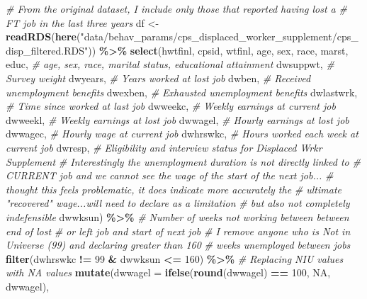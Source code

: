 \documentclass[
]{article}
\newenvironment{Shaded}{\begin{snugshade}}{\end{snugshade}}
\newcommand{\AttributeTok}[1]{\textcolor[rgb]{0.13,0.29,0.53}{#1}}
\newcommand{\CommentTok}[1]{\textcolor[rgb]{0.56,0.35,0.01}{\textit{#1}}}
\newcommand{\ConstantTok}[1]{\textcolor[rgb]{0.56,0.35,0.01}{#1}}
\newcommand{\DecValTok}[1]{\textcolor[rgb]{0.00,0.00,0.81}{#1}}
\newcommand{\FunctionTok}[1]{\textcolor[rgb]{0.13,0.29,0.53}{\textbf{#1}}}
\newcommand{\NormalTok}[1]{#1}
\newcommand{\OtherTok}[1]{\textcolor[rgb]{0.56,0.35,0.01}{#1}}
\newcommand{\SpecialCharTok}[1]{\textcolor[rgb]{0.81,0.36,0.00}{\textbf{#1}}}
\newcommand{\StringTok}[1]{\textcolor[rgb]{0.31,0.60,0.02}{#1}}
\begin{document}
\begin{Shaded}
\begin{Highlighting}[]
\CommentTok{\# From the original dataset, I include only those that reported having lost a }
\CommentTok{\# FT job in the last three years}
\NormalTok{df }\OtherTok{\textless{}{-}} \FunctionTok{readRDS}\NormalTok{(}\FunctionTok{here}\NormalTok{(}\StringTok{"data/behav\_params/cps\_displaced\_worker\_supplement/cps\_disp\_filtered.RDS"}\NormalTok{)) }\SpecialCharTok{\%\textgreater{}\%} 
  \FunctionTok{select}\NormalTok{(hwtfinl, cpsid, wtfinl, age, sex, race, marst, educ, }
         \CommentTok{\# age, sex, race, marital status, educational attainment}
\NormalTok{         dwsuppwt, }\CommentTok{\# Survey weight}
\NormalTok{         dwyears, }\CommentTok{\# Years worked at lost job}
\NormalTok{         dwben, }\CommentTok{\# Received unemployment benefits}
\NormalTok{         dwexben, }\CommentTok{\# Exhausted unemployment benefits}
\NormalTok{         dwlastwrk, }\CommentTok{\# Time since worked at last job}
\NormalTok{         dwweekc, }\CommentTok{\# Weekly earnings at current job}
\NormalTok{         dwweekl, }\CommentTok{\# Weekly earnings at lost job}
\NormalTok{         dwwagel, }\CommentTok{\# Hourly earnings at lost job}
\NormalTok{         dwwagec, }\CommentTok{\# Hourly wage at current job}
\NormalTok{         dwhrswkc, }\CommentTok{\# Hours worked each week at current job}
\NormalTok{         dwresp, }\CommentTok{\# Eligibility and interview status for Displaced Wrkr Supplement}
         \CommentTok{\# Interestingly the unemployment duration is not directly linked to }
         \CommentTok{\# CURRENT job and we cannot see the wage of the start of the next job...}
        \CommentTok{\# thought this feels problematic, it does indicate more accurately the }
        \CommentTok{\# ultimate "recovered" wage...will need to declare as a limitation }
        \CommentTok{\# but also not completely indefensible}
\NormalTok{         dwwksun) }\SpecialCharTok{\%\textgreater{}\%}  \CommentTok{\# Number of weeks not working between between end of lost}
         \CommentTok{\# or left job and start of next job}
  \CommentTok{\# I remove anyone who is Not in Universe (99) and declaring greater than 160 }
  \CommentTok{\# weeks unemployed between jobs}
\FunctionTok{filter}\NormalTok{(dwhrswkc }\SpecialCharTok{!=} \DecValTok{99} \SpecialCharTok{\&}\NormalTok{ dwwksun }\SpecialCharTok{\textless{}=} \DecValTok{160}\NormalTok{) }\SpecialCharTok{\%\textgreater{}\%} 
  \CommentTok{\# Replacing NIU values with NA values}
  \FunctionTok{mutate}\NormalTok{(}\AttributeTok{dwwagel =} \FunctionTok{ifelse}\NormalTok{(}\FunctionTok{round}\NormalTok{(dwwagel) }\SpecialCharTok{==} \DecValTok{100}\NormalTok{, }\ConstantTok{NA}\NormalTok{, dwwagel),}

\end{Highlighting}
\end{Shaded}
\end{document}
